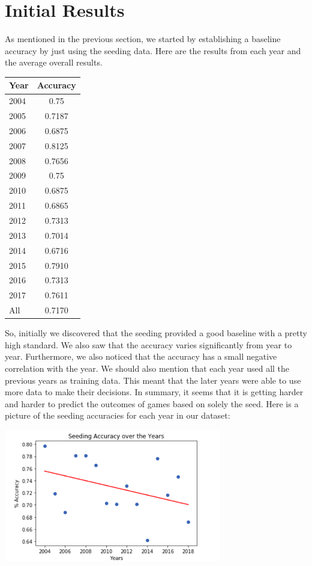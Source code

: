 \section{Initial Results}
As mentioned in the previous section, we started by establishing a baseline accuracy by just using the seeding data.
Here are the results from each year and the average overall results.

\vspace{0.5cm}
\begin{tabular}{lc}
  \toprule
  Year & Accuracy\\
  \midrule
  2004 & 0.75\\
  2005 & 0.7187\\
  2006 & 0.6875\\
  2007 & 0.8125\\
  2008 & 0.7656\\
  2009 & 0.75\\
  2010 & 0.6875\\
  2011 & 0.6865\\
  2012 & 0.7313\\
  2013 & 0.7014\\
  2014 & 0.6716\\
  2015 & 0.7910\\
  2016 & 0.7313\\
  2017 & 0.7611\\
  All & 0.7170\\
  \bottomrule
\end{tabular}
\vspace{0.5cm}

So, initially we discovered that the seeding provided a good baseline with a pretty high standard. 
We also saw that the accuracy varies significantly from year to year. 
Furthermore, we also noticed that the accuracy has a small negative correlation with the year. 
We should also mention that each year used all the previous years as training data.
This meant that the later years were able to use more data to make their decisions.
In summary, it seems that it is getting harder and harder to predict the outcomes of games based on solely the seed.
Here is a picture of the seeding accuracies for each year in our dataset:

\begin{center}
  \includegraphics[width=9.5cm]{SeedingAccuracies.png}
\end{center}

